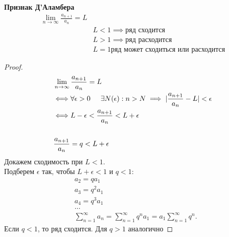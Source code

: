 \begin{priz}
    \label{priz:dalamber} \textbf{Признак Д'Аламбера} \\
    \begin{equation}
        \begin{align*}
            \lim_{n\to\infty}\frac{a_{n+1}}{a_{n}} = L\\
            &L < 1\implies \text{ряд сходится}\\
            &L > 1\implies \text{ряд расходится}\\
            &L = 1 \text{ряд может сходиться или расходится}
        \end{align*}
    \end{equation}
    \begin{proof}
        \begin{equation}
            \begin{align*}
                &\lim_{n\to\infty}\frac{a_{n+1}}{a_{n}} = L \\
                &\Longleftrightarrow \forall \epsilon > 0 \hspace{0.5cm} \exists N(\epsilon) : 
                n>N\implies |\frac{a_{n + 1}}{a_{n}} - L| < \epsilon\\
                &\Longleftrightarrow L - \epsilon < \frac{a_{n + 1}}{a_{n}} < L + \epsilon\\
                &\\
                &\frac{a_{n+1}}{a_{n}} = q  < L + \epsilon\\
            \end{align*}
        \end{equation}
        Докажем сходимость при \(L < 1\).\\
        Подберем \(\epsilon\) так, чтобы \(L+\epsilon < 1\) и \(q < 1\):
        \begin{equation}
            \begin{align*}
                &a_{2} = q a_{1}\\
                &a_{3} = q^{2} a_{1}\\
                &a_{4} = q^{3} a_{1}\\
                & \dots \\
                & \sum_{n=1}^{\infty} a_{n} = \sum_{n=1}^{\infty} q^{n} a_{1} 
                = a_{1}\sum_{n=1}^{\infty}q^{n}.
            \end{align*}
        \end{equation}
        Если \(q < 1\), то ряд сходится. Для \(q > 1\) аналогично
    \end{proof}
\end{priz}


